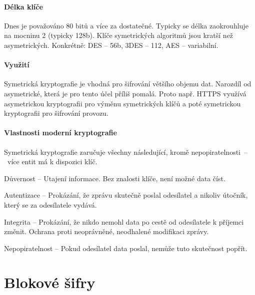 \paragraph*{Délka klíče} Dnes je považováno 80 bitů a více za dostatečné. Typicky se délka zaokrouhluje na mocninu 2 (typicky 128b). Klíče symetrických algoritmů jsou kratší než asymetrických. Konkrétně: DES -- 56b, 3DES -- 112, AES -- variabilní.

\paragraph*{Využití} Symetrická kryptografie je vhodná pro šifrování většího objemu dat. Narozdíl od asymetrické, která je pro tento účel příliš pomalá. Proto např. HTTPS využívá asymetrickou kryptografii pro výměnu symetrických klíčů a poté symetrickou kryptografii pro šifrování provozu.

\paragraph*{Vlastnosti moderní kryptografie} Symetrická kryptografie zaručuje všechny následující, kromě nepopiratelnosti~--~více entit má k dispozici klíč. \begin{compactitem}
    \item Důvernost -- Utajení informace. Bez znalosti klíče, není možné data číst.

    \item Autentizace -- Prokázání, že zprávu skutečně poslal odesílatel a nikoliv útočník, který se za odesílatele vydává.

    \item Integrita -- Prokázání, že nikdo nemohl data po cestě od odesílatele k příjemci změnit. Ochrana proti neoprávněné, neodhalené modifikaci zprávy.

    \item Nepopiratelnost -- Pokud odesílatel data poslal, nemůže tuto skutečnost popřít.
\end{compactitem}


\section{Blokové šifry}

